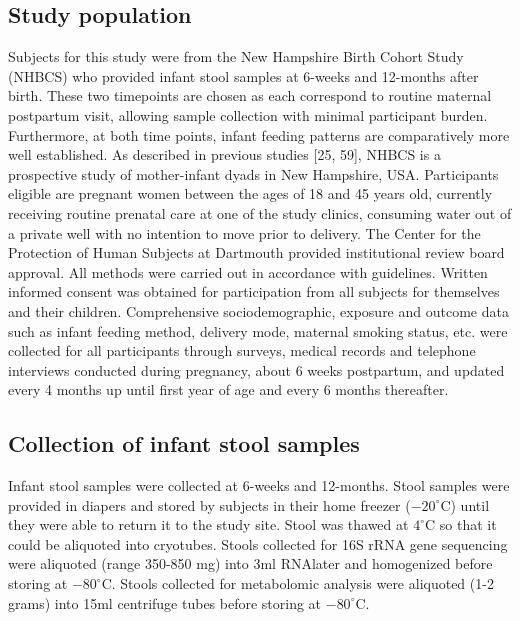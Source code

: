 \subsection{Study population} 
Subjects for this study were from the New Hampshire Birth Cohort Study (NHBCS) who provided infant stool samples at 6-weeks and 12-months after birth. These two timepoints are chosen as each correspond to routine maternal postpartum visit, allowing sample collection with minimal participant burden. Furthermore, at both time points, infant feeding patterns are comparatively more well established. As described in previous studies [25, 59], NHBCS is a prospective study of mother-infant dyads in New Hampshire, USA. Participants eligible are pregnant women between the ages of 18 and 45 years old, currently receiving routine prenatal care at one of the study clinics, consuming water out of a private well with no intention to move prior to delivery. The Center for the Protection of Human Subjects at Dartmouth provided institutional review board approval. All methods were carried out in accordance with guidelines. Written informed consent was obtained for participation from all subjects for themselves and their children. Comprehensive sociodemographic, exposure and outcome data such as infant feeding method, delivery mode, maternal smoking status, etc. were collected for all participants through surveys, medical records and telephone interviews conducted during pregnancy, about 6 weeks postpartum, and updated every 4 months up until first year of age and every 6 months thereafter. 
\subsection{Collection of infant stool samples}
Infant stool samples were collected at 6-weeks and 12-months. Stool samples were provided in diapers and stored by subjects in their home freezer ($-20^{\circ}$C) until they were able to return it to the study site.  Stool was thawed at $4^{\circ}$C so that it could be aliquoted into cryotubes. Stools collected for 16S rRNA gene sequencing were aliquoted (range 350-850 mg) into 3ml RNAlater and homogenized before storing at $-80^{\circ}$C.  Stools collected for metabolomic analysis were aliquoted (1-2 grams) into 15ml centrifuge tubes before storing at $-80 ^{\circ}$C.

